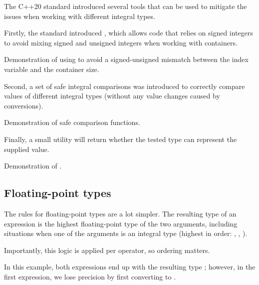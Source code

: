 The C++20 standard introduced several tools that can be used to mitigate the issues when working with different integral types.

Firstly, the standard introduced , which allows code that relies on signed integers to avoid mixing signed and unsigned integers when working with containers.

\begin{codebox}[]{\href{https://compiler-explorer.com/z/jej1djd1W}{\ExternalLink}}
\footnotesize Demonstration of using  to avoid a signed-unsigned mismatch between the index variable and the container size.
\tcblower
{}
\end{codebox}

Second, a set of safe integral comparisons was introduced to correctly compare values of different integral types (without any value changes caused by conversions).

\begin{codebox}[]{\href{https://compiler-explorer.com/z/s5ecd1rfh}{\ExternalLink}}
\footnotesize Demonstration of safe comparison functions.
\tcblower
{}
\end{codebox}

Finally, a small utility  will return whether the tested type can represent the supplied value.

\begin{codebox}[]{\href{https://compiler-explorer.com/z/M3M3bMEYK}{\ExternalLink}}
\footnotesize Demonstration of .
\tcblower
{}
\end{codebox}

\subsection{Floating-point types}

The rules for floating-point types are a lot simpler. The resulting type of an expression is the highest floating-point type of the two arguments, including situations when one of the arguments is an integral type (highest in order: , , ).

Importantly, this logic is applied per operator, so ordering matters. 

\begin{codebox}[breakable]{\href{https://compiler-explorer.com/z/dvncjjGj6}{\ExternalLink}}
\footnotesize In this example, both expressions end up with the resulting type ; however, in the first expression, we lose precision by first converting to .
\tcblower
{}
\end{codebox}

